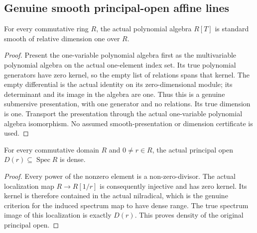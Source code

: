 \subsection{Genuine smooth principal-open affine lines}
\label{subsec:smooth-principal-open-lines}

\begin{theorem}
\label{algebra:polynomial-line-standard-smooth}
\leanok
For every commutative ring $R$, the actual polynomial algebra $R[T]$
is standard smooth of relative dimension one over $R$.
\end{theorem}
\begin{proof}
Present the one-variable polynomial algebra first as the multivariable
polynomial algebra on the actual one-element index set. Its true
polynomial generators have zero kernel, so the empty list of relations
spans that kernel. The empty differential is the actual identity on its
zero-dimensional module; its determinant and its image in the algebra
are one. Thus this is a genuine submersive presentation, with one
generator and no relations. Its true dimension is one. Transport the
presentation through the actual one-variable polynomial algebra
isomorphism. No assumed smooth-presentation or dimension certificate is used.
\end{proof}

\begin{theorem}
\label{algebra:domain-dense-principal-open}
\leanok
For every commutative domain $R$ and $0\ne r\in R$, the actual principal
open $D(r)\subseteq\operatorname{Spec}R$ is dense.
\end{theorem}
\begin{proof}
Every power of the nonzero element is a non-zero-divisor. The actual
localization map $R\to R[1/r]$ is consequently injective and has zero
kernel. Its kernel is therefore contained in the actual nilradical,
which is the genuine criterion for the induced spectrum map to have
dense range. The true spectrum image of this localization is exactly
$D(r)$. This proves density of the original principal open.
\end{proof}

